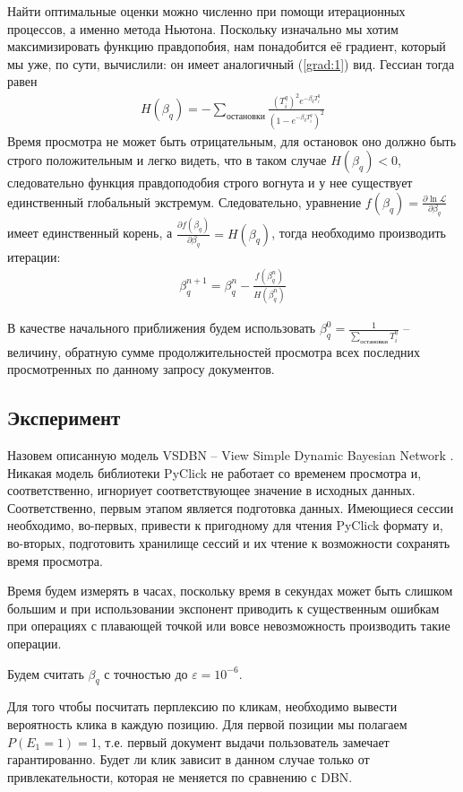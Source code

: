 \documentclass[diploma]{nanolab2015}
\begin{document}
  Найти оптимальные оценки можно численно при помощи итерационных процессов, а именно метода Ньютона. Поскольку изначально мы хотим максимизировать функцию правдопобия, нам понадобится её градиент, который мы уже, по сути, вычислили: он имеет аналогичный (\ref{grad:1}) вид. Гессиан тогда равен
  \begin{align}
    H(\beta_q) = - \sum_{\text{остановки}} \frac{(T_i^q)^2 e^{-\beta_q T_i^q}}{(1 - e^{-\beta_q T_i^q})^2}
  \end{align}
  Время просмотра не может быть отрицательным, для остановок оно должно быть строго положительным и легко видеть, что в таком случае $H(\beta_q) < 0$, следовательно функция правдоподобия строго вогнута и у нее существует единственный глобальный экстремум. Следовательно, уравнение $ f(\beta_q) = \frac{\partial \ln \mathcal{L}}{\partial \beta_q}$ имеет единственный корень, а $\frac{\partial f(\beta_q)}{\partial \beta_q} = H(\beta_q)$, тогда необходимо производить итерации:
  \begin{align}
    \beta_q^{n+1} = \beta_q^{n} - \frac{f(\beta_q^n)}{H(\beta_q^n)}
  \end{align}

  В качестве начального приближения будем использовать $\beta_q^0 = \frac{1}{\sum\limits_{\text{остановки}} T_i^q}$ -- величину, обратную сумме продолжительностей просмотра всех последних просмотренных по данному запросу документов.

  \subsection{Эксперимент}
  Назовем описанную модель VSDBN -- View Simple Dynamic Bayesian Network \cite{vsdbn}.
  Никакая модель библиотеки PyClick не работает со временем просмотра и, соответственно, игнориует соответствующее значение в исходных данных. Соответственно, первым этапом является подготовка данных. Имеющиеся сессии \cite{vkds} необходимо, во-первых, привести к пригодному для чтения PyClick формату и, во-вторых, подготовить хранилище сессий и их чтение к возможности сохранять время просмотра.

  Время будем измерять в часах, поскольку время в секундах может быть слишком большим и при использовании экспонент приводить к существенным ошибкам при операциях с плавающей точкой или вовсе невозможность производить такие операции.

  Будем считать $\beta_q$ с точностью до $\varepsilon = 10^{-6}$.

  Для того чтобы посчитать перплексию по кликам, необходимо вывести вероятность клика в каждую позицию. Для первой позиции мы полагаем $P(E_1 = 1) = 1$, т.е. первый документ выдачи пользователь замечает гарантированно. Будет ли клик зависит в данном случае только от привлекательности, которая не меняется по сравнению с DBN.
\end{document}
